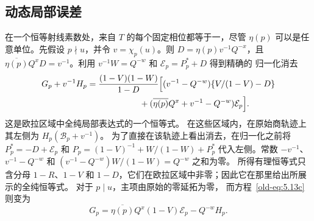 \documentclass[11pt,a4paper]{article}
\numberwithin{equation}{section}
\numberwithin{figure}{section}
\theoremstyle{definition}
\theoremstyle{remark}
\begin{document}
\subsection{动态局部误差}在一个恒等射线素数处，来自 $T$ 的每个固定相位都等于一，尽管
$\eta(p)$ 可以是任意单位。先假设 $p\nmid u$，并令
$v=\chi_p(u)$。则 $D=\eta(p)v^{-1}Q^{-x}$，且
$\overline{\eta(p)}Q^xD=v^{-1}$。利用
$v^{-1}W=Q^{-w}$ 和 $\mathcal E_p=P_p^*+D$ 得到精确的
归一化消去
\begin{equation}\label{old-eq:5.13b}
\begin{split}
 G_p+v^{-1}H_p={}&
 \frac{(1-V)(1-W)}{1-D}
 \Bigl[(v^{-1}-Q^{-w})\{V/(1-V)-D\}\\
 &\hspace{17mm}+(\overline{\eta(p)}Q^x+v^{-1}-Q^{-w})
                    \mathcal E_p\Bigr].
\end{split}
\end{equation}
这是欧拉区域中全纯局部表达式的一个恒等式。
在这些区域内，在原始商轨迹上其左侧为
$H_p(\mathcal B_p+v^{-1})$。
为了直接在该轨迹上看出消去，在归一化之前将
$P_p^*=-D+\mathcal E_p$ 和
$P_p=(1-V)^{-1}+W/(1-W)+P_p^*$ 代入左侧。常数 $-v^{-1}$、$v^{-1}-Q^{-w}$ 和
$(v^{-1}-Q^{-w})W/(1-W)=Q^{-w}$ 之和为零。
所得有理恒等式只含分母 $1-R$、$1-V$
和 $1-D$，它们在欧拉区域中非零；因此它在那里给出所展示的全纯恒等式。
对于 $p\mid u$，主项由原始的零延拓为零，
而方程~\eqref{old-eq:5.13c} 则变为
\[
 G_p=
 \overline{\eta(p)}Q^x(1-V)\mathcal E_p-Q^{-w}H_p.
\]
\end{document}
